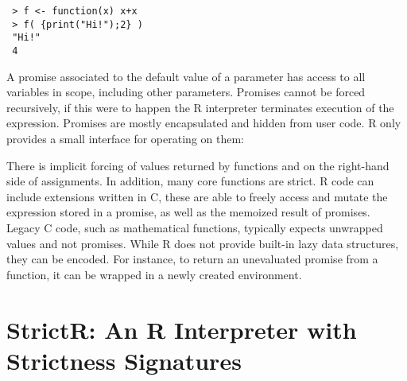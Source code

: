 \documentclass[review,screen,acmsmall]{acmart}
\renewcommand{\c}[1]{\lstinline |#1|\xspace}
\begin{document}
\begin{lstlisting}
 > f <- function(x) x+x
 > f( {print("Hi!");2} )
 "Hi!"
 4
\end{lstlisting}


A promise associated to the default value of a parameter has access to all
variables in scope, including other parameters. Promises cannot be forced
recursively, if this were to happen the R interpreter terminates execution of
the expression. Promises are mostly encapsulated and hidden from user code. R
only provides a small interface for operating on them:


There is implicit forcing of values returned by functions and on the
right-hand side of assignments. In addition, many core functions are strict. R
code can include extensions written in C, these are able to freely access and
mutate the expression stored in a promise, as well as the memoized result of
promises. Legacy C code, such as mathematical functions, typically expects
unwrapped values and not promises. While R does not provide built-in lazy data
structures, they can be encoded. For instance, to return an
unevaluated promise from a function, it can be wrapped in a newly created
environment.

\section{StrictR: An R Interpreter with Strictness Signatures}\label{sec:strictr}
\end{document}
